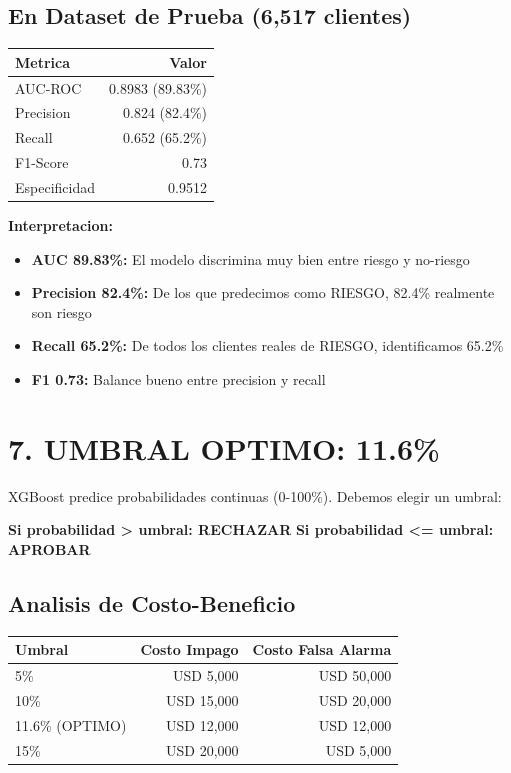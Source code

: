 \documentclass[11pt]{article}
\begin{document}
\subsection*{En Dataset de Prueba (6,517 clientes)}

\begin{tabular}{|l|r|}
\hline
\textbf{Metrica} & \textbf{Valor} \\
\hline
AUC-ROC & 0.8983 (89.83\%) \\
Precision & 0.824 (82.4\%) \\
Recall & 0.652 (65.2\%) \\
F1-Score & 0.73 \\
Especificidad & 0.9512 \\
\hline
\end{tabular}

\textbf{Interpretacion:}
\begin{itemize}
\item \textbf{AUC 89.83\%:} El modelo discrimina muy bien entre riesgo y no-riesgo
\item \textbf{Precision 82.4\%:} De los que predecimos como RIESGO, 82.4\% realmente son riesgo
\item \textbf{Recall 65.2\%:} De todos los clientes reales de RIESGO, identificamos 65.2\%
\item \textbf{F1 0.73:} Balance bueno entre precision y recall
\end{itemize}

\section*{7. UMBRAL OPTIMO: 11.6\%}

XGBoost predice probabilidades continuas (0-100\%). Debemos elegir un umbral:

\textbf{Si probabilidad > umbral: RECHAZAR}
\textbf{Si probabilidad <= umbral: APROBAR}

\subsection*{Analisis de Costo-Beneficio}

\begin{tabular}{|l|r|r|}
\hline
\textbf{Umbral} & \textbf{Costo Impago} & \textbf{Costo Falsa Alarma} \\
\hline
5\% & USD 5,000 & USD 50,000 \\
10\% & USD 15,000 & USD 20,000 \\
11.6\% (OPTIMO) & USD 12,000 & USD 12,000 \\
15\% & USD 20,000 & USD 5,000 \\
\hline
\end{tabular}
\end{document}
